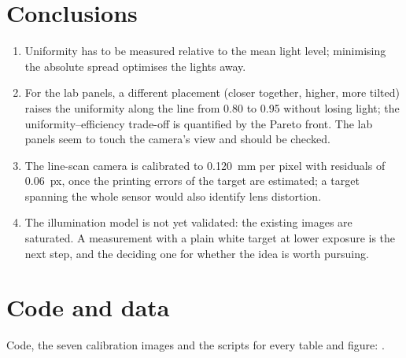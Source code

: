 \documentclass[11pt,a4paper]{article}
\begin{document}
\section{Conclusions}

\begin{enumerate}
  \item Uniformity has to be measured relative to the mean light level; minimising the absolute spread optimises the
    lights away.
  \item For the lab panels, a different placement (closer together, higher, more tilted) raises the uniformity along
    the line from 0.80 to 0.95 without losing light; the uniformity--efficiency trade-off is quantified by the Pareto
    front. The lab panels seem to touch the camera's view and should be checked.
  \item The line-scan camera is calibrated to \SI{0.120}{mm} per pixel with residuals of \SI{0.06}{px}, once the
    printing errors of the target are estimated; a target spanning the whole sensor would also identify lens
    distortion.
  \item The illumination model is not yet validated: the existing images are saturated. A measurement with a plain
    white target at lower exposure is the next step, and the deciding one for whether the idea is worth pursuing.
\end{enumerate}

\section*{Code and data}
Code, the seven calibration images and the scripts for every table and figure: \citet{Repo}.



\end{document}
